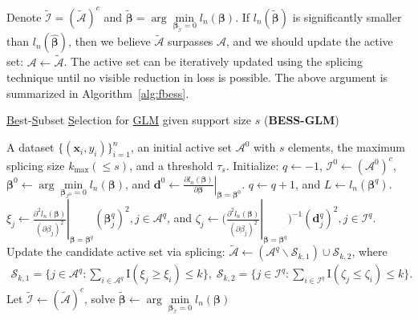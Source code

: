 Denote $\tilde{\mathcal{I}} = (\tilde{\mathcal{A}} )^c$ and $\tilde{\boldsymbol \beta}=\arg\min\limits_{\boldsymbol \beta_{\tilde{\mathcal{I}}}=0} l_n(\boldsymbol \beta)$.
If $l_n(\tilde{\boldsymbol \beta})$ is significantly smaller than $l_n(\hat{ \boldsymbol \beta})$,
then we believe $\tilde{\mathcal{A}}$ surpasses $\mathcal{A}$,
and we should update the active set: $\mathcal{A} \leftarrow \tilde{\mathcal{A}}$.
The active set can be iteratively updated using the splicing technique until no visible reduction in loss is possible. The above argument is summarized in Algorithm~\ref{alg:fbess}.
\begin{algorithm}[htbp]
\caption{\underline{Be}st-\underline{S}ubset \underline{S}election for \underline{GLM} given support size $s$ (\textbf{BESS-GLM})}
\label{alg:fbess}
\begin{algorithmic}[1]
\REQUIRE A dataset $\{(\boldsymbol{x}_i, y_i)\}^{n}_{i=1}$, an initial active set $\mathcal{A}^0$ with $s$ elements,
the maximum splicing size $k_{\max} (\leq s)$, and a threshold $\tau_s$.
\STATE Initialize: $q \leftarrow -1$, $\mathcal{I}^0 \leftarrow (\mathcal{A}^0)^c$,
$\boldsymbol \beta^0 \leftarrow \arg\min\limits_{\boldsymbol \beta_{\mathcal{I}^0}=0} l_n(\boldsymbol \beta)$, and
$\boldsymbol d^{0} \leftarrow \left.\frac{\partial l_n( \boldsymbol \beta )}{\partial \boldsymbol \beta}\right|_{\boldsymbol \beta = \boldsymbol \beta^0 }$.
\REPEAT
\STATE $q \leftarrow q + 1$, and $L \leftarrow l_n(\boldsymbol \beta^q)$.
\STATE $\xi_j \leftarrow \left.\frac{\partial^2 l_n( \boldsymbol \beta )}{ (\partial \beta_{j})^2 }\right|_{\boldsymbol \beta = {\boldsymbol \beta}^q} ({\boldsymbol \beta}^q_j)^2, j\in \mathcal{A}^q$,
and
$\zeta_j \leftarrow \Big(\left.\frac{\partial^2 l_n( \boldsymbol \beta )}{ (\partial \beta_{j} )^2 }\right|_{\boldsymbol \beta = {\boldsymbol \beta}^q} \Big)^{-1}( {\boldsymbol d}^q_j )^2, j\in \mathcal{I}^q$.
\STATE Update the candidate active set via splicing: $\tilde{\mathcal{A}} \leftarrow (\mathcal{A}^q \backslash \mathcal{S}_{k,1}) \cup \mathcal{S}_{k,2}$, where
\begin{align*}
\mathcal{S}_{k,1} = \{j\in \mathcal{A}^q: \sum_{i \in \mathcal{A}^q} \mathrm{I}( \xi_j \geq \xi_i) \leq k\}, \; \mathcal{S}_{k,2} = \{j\in \mathcal{I}^q: \sum_{i \in \mathcal{I}^q} \mathrm{I}( \zeta_j \leq \zeta_i) \leq k\}.
\end{align*}
\STATE Let $\tilde{\mathcal{I}} \leftarrow (\tilde{\mathcal{A}})^c$,
solve $\tilde{\boldsymbol \beta} \leftarrow \arg\min\limits_{\boldsymbol \beta_{\tilde{\mathcal{I}}}=0} l_n(\boldsymbol \beta)$

\end{algorithmic}
\end{algorithm}
